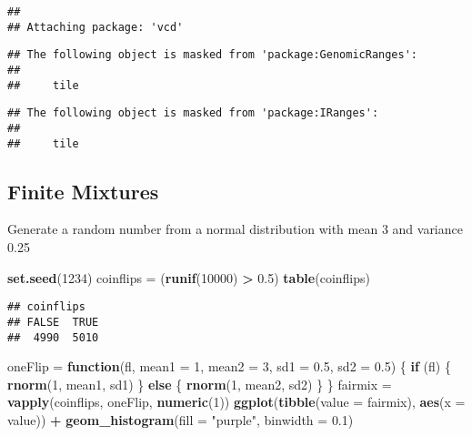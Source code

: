 \documentclass[]{article}
\newenvironment{Shaded}{\begin{snugshade}}{\end{snugshade}}
\newcommand{\ControlFlowTok}[1]{\textcolor[rgb]{0.13,0.29,0.53}{\textbf{#1}}}
\newcommand{\DataTypeTok}[1]{\textcolor[rgb]{0.13,0.29,0.53}{#1}}
\newcommand{\DecValTok}[1]{\textcolor[rgb]{0.00,0.00,0.81}{#1}}
\newcommand{\FloatTok}[1]{\textcolor[rgb]{0.00,0.00,0.81}{#1}}
\newcommand{\KeywordTok}[1]{\textcolor[rgb]{0.13,0.29,0.53}{\textbf{#1}}}
\newcommand{\NormalTok}[1]{#1}
\newcommand{\OperatorTok}[1]{\textcolor[rgb]{0.81,0.36,0.00}{\textbf{#1}}}
\newcommand{\StringTok}[1]{\textcolor[rgb]{0.31,0.60,0.02}{#1}}
\begin{document}
\begin{verbatim}
## 
## Attaching package: 'vcd'
\end{verbatim}

\begin{verbatim}
## The following object is masked from 'package:GenomicRanges':
## 
##     tile
\end{verbatim}

\begin{verbatim}
## The following object is masked from 'package:IRanges':
## 
##     tile
\end{verbatim}

\hypertarget{finite-mixtures}{%
\subsection{Finite Mixtures}\label{finite-mixtures}}

Generate a random number from a normal distribution with mean 3 and
variance 0.25

\begin{Shaded}
\begin{Highlighting}[]
\KeywordTok{set.seed}\NormalTok{(}\DecValTok{1234}\NormalTok{)}
\NormalTok{coinflips =}\StringTok{ }\NormalTok{(}\KeywordTok{runif}\NormalTok{(}\DecValTok{10000}\NormalTok{) }\OperatorTok{>}\StringTok{ }\FloatTok{0.5}\NormalTok{)}
\KeywordTok{table}\NormalTok{(coinflips)}
\end{Highlighting}
\end{Shaded}

\begin{verbatim}
## coinflips
## FALSE  TRUE 
##  4990  5010
\end{verbatim}

\begin{Shaded}
\begin{Highlighting}[]
\NormalTok{oneFlip =}\StringTok{ }\ControlFlowTok{function}\NormalTok{(fl, }\DataTypeTok{mean1 =} \DecValTok{1}\NormalTok{, }\DataTypeTok{mean2 =} \DecValTok{3}\NormalTok{, }\DataTypeTok{sd1 =} \FloatTok{0.5}\NormalTok{, }\DataTypeTok{sd2 =} \FloatTok{0.5}\NormalTok{) \{}
  \ControlFlowTok{if}\NormalTok{ (fl) \{}
   \KeywordTok{rnorm}\NormalTok{(}\DecValTok{1}\NormalTok{, mean1, sd1)}
\NormalTok{  \} }\ControlFlowTok{else}\NormalTok{ \{}
   \KeywordTok{rnorm}\NormalTok{(}\DecValTok{1}\NormalTok{, mean2, sd2)}
\NormalTok{  \}}
\NormalTok{\}}
\NormalTok{fairmix =}\StringTok{ }\KeywordTok{vapply}\NormalTok{(coinflips, oneFlip, }\KeywordTok{numeric}\NormalTok{(}\DecValTok{1}\NormalTok{))}
\KeywordTok{ggplot}\NormalTok{(}\KeywordTok{tibble}\NormalTok{(}\DataTypeTok{value =}\NormalTok{ fairmix), }\KeywordTok{aes}\NormalTok{(}\DataTypeTok{x =}\NormalTok{ value)) }\OperatorTok{+}
\StringTok{     }\KeywordTok{geom_histogram}\NormalTok{(}\DataTypeTok{fill =} \StringTok{"purple"}\NormalTok{, }\DataTypeTok{binwidth =} \FloatTok{0.1}\NormalTok{)}
\end{Highlighting}
\end{Shaded}
\end{document}
